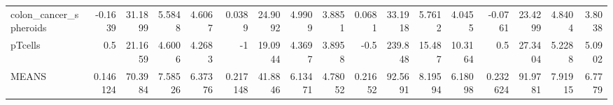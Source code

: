 \begin{tabular}{lrrrrrrrrrrrrrrrr}
 colon\_cancer\_spheroids                      &             -0.1639   &          31.1899 &           5.5848  &          4.6067  &         0.0389   &     24.9092 &      4.9909  &     3.8851  &        0.0681  &   33.1918 &    5.7612  &   4.0455  &        -0.0761   &     23.4299 &      4.8404  &      3.8038 \\
 pTcells                                     &              0.5      &          21.1659 &           4.6006  &          4.2683  &        -1        &     19.0944 &      4.3697  &     3.8958  &       -0.5     &  239.848  &   15.487   &  10.3164  &         0.5      &     27.3404 &      5.2288  &      5.0902 \\
 MEANS                                       &              0.146124 &          70.3984 &           7.58526 &          6.37376 &         0.217148 &     41.8846 &      6.13471 &     4.78052 &        0.21652 &   92.5691 &    8.19594 &   6.18098 &         0.232624 &     91.9781 &      7.91915 &      6.7779 \\
\hline
\end{tabular}